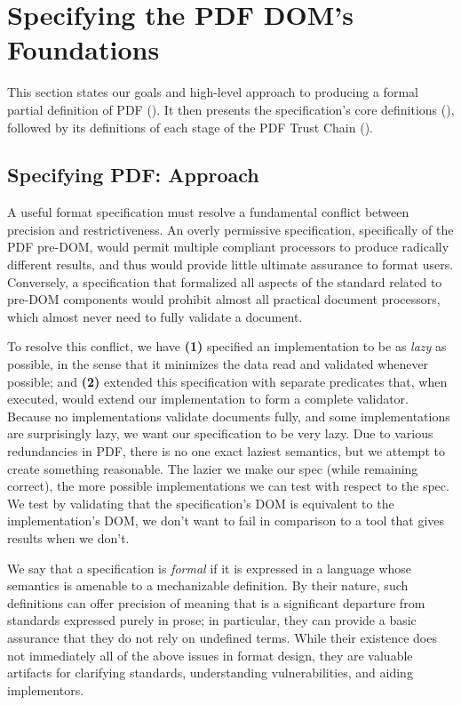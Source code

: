 \section{Specifying the PDF DOM's Foundations}
\label{sec:specifying}

This section %
states our goals and high-level approach to producing a formal partial definition of PDF ().
It then presents the specification's core
definitions (), followed by its definitions of each
stage of the PDF Trust Chain ().

\subsection{Specifying PDF: Approach}
\label{sec:spec-approach}

A useful format specification must resolve a fundamental conflict between precision and restrictiveness.
%
An overly permissive specification, specifically of the PDF pre-DOM,  would permit multiple compliant processors to produce radically different results, and thus would provide little ultimate assurance to format users.
%
Conversely, a specification that formalized all aspects of the standard related to pre-DOM components would prohibit almost all practical document processors, which almost never need to fully validate a document.

To resolve this conflict, we have %
\textbf{(1)} specified an implementation to be as \emph{lazy} as possible, in the sense that it minimizes the data read and validated whenever possible; and %
\textbf{(2)} extended this specification
with separate  predicates that, when executed,
would extend our implementation to form a complete validator.
%
Because no implementations validate documents fully, and some implementations
are surprisingly lazy, we want our specification to be very lazy.
%
Due to various redundancies in PDF, there is no one exact
laziest semantics, but we attempt to create something reasonable.
%
The lazier we make our spec (while remaining correct), the more
possible implementations we can test with respect to the spec.
%
We test by validating that the specification's DOM is equivalent to the implementation's DOM,
we don't want to fail in comparison to a tool that gives results when we don't.

We say that a specification is \emph{formal} if it is expressed in a language whose semantics is amenable to a mechanizable definition.
%
By their nature, such definitions can offer precision of meaning that is a significant departure from standards expressed purely in prose;
%
in particular, they can provide a basic assurance that they do not rely on undefined terms.
%
While their existence does not immediately all of the above issues in format design, they are valuable artifacts for clarifying
 standards, understanding vulnerabilities, and aiding implementors.

